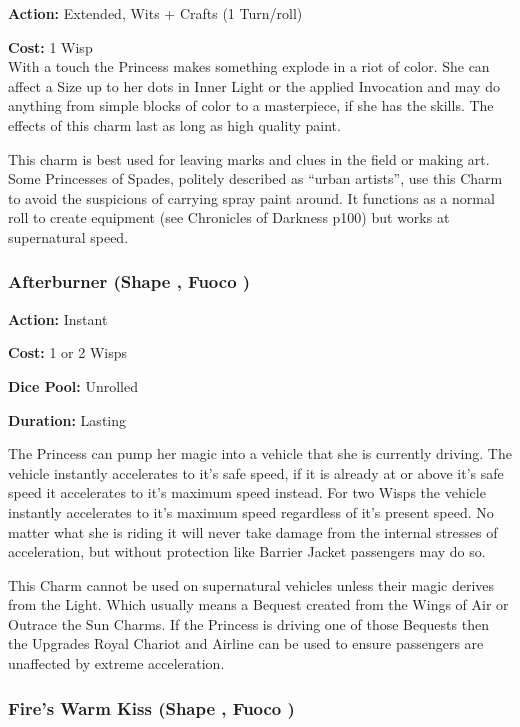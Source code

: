\noindent \textbf{Action:} Extended, Wits + Crafts (1 Turn/roll)

\noindent \textbf{Cost:} 1 Wisp \\

\noindent With a touch the Princess makes something explode in a riot of color. She can affect a Size up to her dots in Inner Light or the applied Invocation and may do anything from simple blocks of color to a masterpiece, if she has the skills. The effects of this charm last as long as high quality paint.

This charm is best used for leaving marks and clues in the field or making art. Some Princesses of Spades, politely described as \textquotedblleft urban artists\textquotedblright , use this Charm to avoid the suspicions of carrying spray paint around. It functions as a normal roll to create equipment (see Chronicles of Darkness p100) but works at supernatural speed.

\subsubsection*{Afterburner (Shape \textbullet, Fuoco \textbullet\textbullet)}

\noindent \textbf{Action:} Instant

\noindent \textbf{Cost:} 1 or 2 Wisps

\noindent \textbf{Dice Pool:} Unrolled

\noindent \textbf{Duration:} Lasting

The Princess can pump her magic into a vehicle that she is currently driving. The vehicle instantly accelerates to it's safe speed, if it is already at or above it's safe speed it accelerates to it's maximum speed instead. For two Wisps the vehicle instantly accelerates to it's maximum speed regardless of it's present speed. No matter what she is riding it will never take damage from the internal stresses of acceleration, but without protection like Barrier Jacket passengers may do so.

This Charm cannot be used on supernatural vehicles unless their magic derives from the Light. Which usually means a Bequest created from the Wings of Air or Outrace the Sun Charms. If the Princess is driving one of those Bequests then the Upgrades Royal Chariot and Airline can be used to ensure passengers are unaffected by extreme acceleration.  

\subsubsection*{Fire's Warm Kiss (Shape \textbullet, Fuoco \textbullet\textbullet)}

